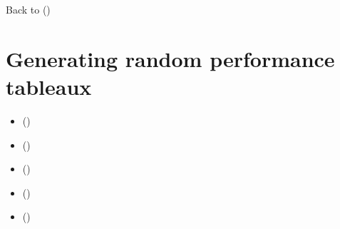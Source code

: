 \documentclass[a4paper,10pt,english]{sphinxhowto}
\begin{document}
Back to {\hyperref[\detokenize{tutorial:tutorial-label}]{}} ()


\section{Generating random performance tableaux}
\label{\detokenize{tutorial:generating-random-performance-tableaux}}\label{\detokenize{tutorial:randomperformancetableau-tutorial-label}}
\begin{sphinxShadowBox}
\begin{itemize}
\item {} 
\label{\detokenize{tutorial:id191}}{\hyperref[\detokenize{tutorial:introduction}]{}} ()

\item {} 
\label{\detokenize{tutorial:id192}}{\hyperref[\detokenize{tutorial:generating-standard-random-performance-tableaux}]{}} ()

\item {} 
\label{\detokenize{tutorial:id193}}{\hyperref[\detokenize{tutorial:generating-random-cost-benefit-tableaux}]{}} ()

\item {} 
\label{\detokenize{tutorial:id194}}{\hyperref[\detokenize{tutorial:generating-three-objectives-tableaux}]{}} ()

\item {} 
\label{\detokenize{tutorial:id195}}{\hyperref[\detokenize{tutorial:generating-random-linearly-ranked-performances}]{}} ()

\end{itemize}
\end{sphinxShadowBox}
\end{document}
